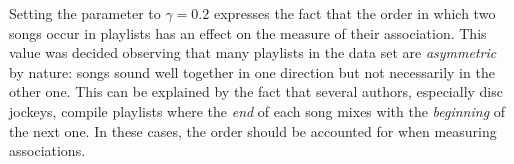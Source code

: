 
Setting the parameter to $\gamma = 0.2$ expresses the fact that the order in which two songs occur in playlists has an effect on the measure of their association. 
This value was decided observing that many playlists in the data set are \emph{asymmetric} by nature: songs sound well together in one direction but not necessarily in the other one. 
This can be explained by the fact that several authors, especially disc jockeys, compile playlists where the \emph{end} of each song mixes with the \emph{beginning} of the next one.
In these cases, the order should be accounted for when measuring associations.



% 
% 
% 
% 
% 
% 
% 
% 



